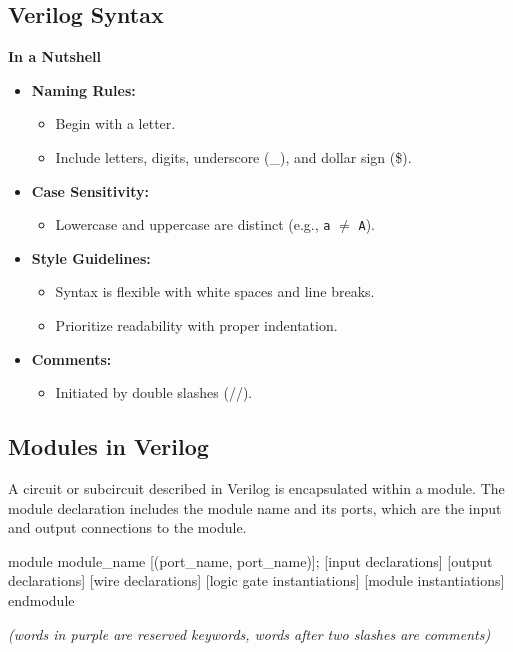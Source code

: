 \documentclass[12pt,openany]{book}
\begin{document}
			      	\subsection{Verilog Syntax}
			      	\textbf{In a Nutshell}
			      	\begin{itemize}
			      		\item[] \textbf{Naming Rules:}
			      		      \begin{itemize}
			      		      	\item[] Begin with a letter.
			      		      	\item[] Include letters, digits, underscore (\_), and dollar sign (\$).
			      		      \end{itemize}
			      		        
			      		\item[] \textbf{Case Sensitivity:}
			      		      \begin{itemize}
			      		      	\item[] Lowercase and uppercase are distinct (e.g., \texttt{a} $\neq$ \texttt{A}).
			      		      \end{itemize}
			      		        
			      		\item[] \textbf{Style Guidelines:}
			      		      \begin{itemize}
			      		      	\item[] Syntax is flexible with white spaces and line breaks.
			      		      	\item[] Prioritize readability with proper indentation.
			      		      \end{itemize}
			      		        
			      		\item[] \textbf{Comments:}
			      		      \begin{itemize}
			      		      	\item[] Initiated by double slashes (//).
			      		      \end{itemize}
			      	\end{itemize}

			      	\subsection{Modules in Verilog}
			      	A circuit or subcircuit described in Verilog is encapsulated within a module. The module declaration includes the module name and its ports, which are the input and output connections to the module.
			      	\begin{vhdl}
module module_name [(port_name{, port_name})];
[input declarations]
[output declarations]
[wire declarations]
[logic gate instantiations]
[module instantiations]
endmodule
			      	\end{vhdl}
			      	\textit{(words in purple are reserved keywords, words after two slashes are comments)} 
			  
\end{document}
